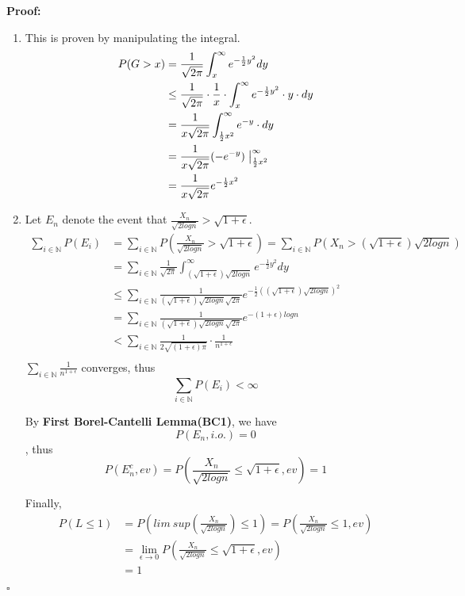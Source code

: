 \documentclass[UTF8, 12pt]{article}
\newenvironment{proof}{\noindent\ignorespaces\textbf{Proof:}}{\hfill $\square$\par\noindent}
\theoremstyle{break}
\begin{document}
    \begin{proof}
        \begin{enumerate}
            \item This is proven by manipulating the integral.
            \begin{align*}
                P(G > x) &= \frac{1}{\sqrt{2\pi}}\int_{x}^{\infty}e^{-\frac{1}{2}y^2}dy \\
                &\leq \frac{1}{\sqrt{2\pi}} \cdot \frac{1}{x} \cdot \int_{x}^{\infty}e^{-\frac{1}{2}y^2}\cdot y \cdot dy \\
                &= \frac{1}{x\sqrt{2\pi}} \int_{\frac{1}{2}x^2}^{\infty}e^{-y}\cdot dy \\
                &= \frac{1}{x\sqrt{2\pi}} (-e^{-y})\bigm|^{\infty}_{\frac{1}{2}x^2} \\
                &= \frac{1}{x\sqrt{2\pi}}e^{-\frac{1}{2}x^2}
            \end{align*}

            \item Let $E_n$ denote the event that $\frac{X_n}{\sqrt{2logn}} > \sqrt{1 + \epsilon}$.
            \begin{align*}
                \sum_{i \in \mathbb{N}} P(E_i) &= \sum_{i \in \mathbb{N}} P(\frac{X_n}{\sqrt{2logn}} > \sqrt{1 + \epsilon}) = \sum_{i \in \mathbb{N}} P(X_n > (\sqrt{1 + \epsilon})\sqrt{2logn})\\
                &= \sum_{i \in \mathbb{N}} \frac{1}{\sqrt{2\pi}}\int_{ (\sqrt{1 + \epsilon})\sqrt{2logn} }^{\infty}e^{-\frac{1}{2}y^2}dy \\
                &\leq \sum_{i \in \mathbb{N}} \frac{1}{ (\sqrt{1 + \epsilon})\sqrt{2logn} \sqrt{2\pi}} e^{-\frac{1}{2}((\sqrt{1 + \epsilon})\sqrt{2logn})^2} \\
                &= \sum_{i \in \mathbb{N}} \frac{1}{ (\sqrt{1 + \epsilon})\sqrt{2logn} \sqrt{2\pi}} e^{-(1 + \epsilon)logn} \\
                &< \sum_{i \in \mathbb{N}} \frac{1}{ 2\sqrt{(1 + \epsilon)\pi}} \cdot \frac{1}{n ^ {1 + \epsilon}} \\
            \end{align*}
            $\sum_{i \in \mathbb{N}} \frac{1}{n ^ {1 + \epsilon}}$ converges, thus $$  \sum_{i \in \mathbb{N}} P(E_i) < \infty $$

            By \textbf{First Borel-Cantelli Lemma(BC1)}, we have $$ P(E_n, i.o.) = 0 $$ ,
            thus $$ P(E_n^c,ev) = P(\frac{X_n}{\sqrt{2logn}} \leq \sqrt{1 + \epsilon}, ev) = 1 $$
            
            Finally,
            \begin{align*}
                P(L \leq 1) &= P( lim\ sup(\frac{X_n}{\sqrt{2logn}}) \leq 1) = P(\frac{X_n}{\sqrt{2logn}} \leq 1, ev) \\
                &= \lim_{\epsilon\to 0} P(\frac{X_n}{\sqrt{2logn}} \leq \sqrt{1 + \epsilon}, ev) \\
                &= 1
            \end{align*}
        \end{enumerate}
    \end{proof}
\end{document}
